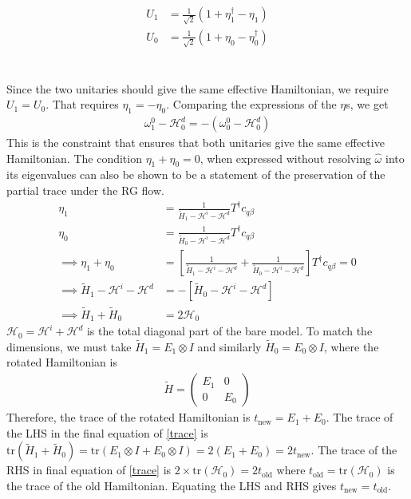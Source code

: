 \documentclass[twoside]{report}
\numberwithin{equation}{section}
\begin{document}
\begin{equation}\begin{aligned}
	U_1 &= \frac{1}{\sqrt 2}\left(1 + \eta_1^\dagger - \eta_1\right)\\
	U_0 &= \frac{1}{\sqrt 2}\left(1 + \eta_0 - \eta_0^\dagger\right)
\end{aligned}\end{equation}
\\\\Since the two unitaries should give the same effective Hamiltonian, we require \(U_1 = U_0\). That requires \(\eta_1 = -\eta_0\). Comparing the expressions of the \(\eta\)s, we get
\begin{equation}\begin{aligned}
	\omega_1^0 - \mathcal{H}^d_0 = -\left(\omega_0^0 - \mathcal{H}^d_0\right)
\end{aligned}\end{equation}
This is the constraint that ensures that both unitaries give the same effective Hamiltonian. The condition \(\eta_1 + \eta_0 = 0\), when expressed without resolving \(\hat \omega\) into its eigenvalues can also be shown to be a statement of the preservation of the partial trace under the RG flow.
\begin{equation}\begin{aligned}
	\label{trace}
\eta_1 &= \frac{1}{\tilde H_1 - \mathcal{H}^i - \mathcal{H}^d}T^\dagger c_{q\beta}\\
\eta_0 &= \frac{1}{\tilde H_0 - \mathcal{H}^i - \mathcal{H}^d}T^\dagger c_{q\beta}\\
\implies  \eta_1 + \eta_0 &= \left[\frac{1}{\tilde H_1 - \mathcal{H}^i - \mathcal{H}^d} + \frac{1}{\tilde H_0 - \mathcal{H}^i - \mathcal{H}^d}\right]T^\dagger c_{q\beta} = 0\\
\implies \tilde H_1 - \mathcal{H}^i - \mathcal{H}^d &= -\left[\tilde H_0 - \mathcal{H}^i - \mathcal{H}^d\right]\\
\implies \tilde H_1 + \tilde H_0 &= 2\mathcal{H}_0
\end{aligned}\end{equation}
\(\mathcal{H}_0 = \mathcal{H}^i + \mathcal{H}^d\) is the total diagonal part of the bare model. To match the dimensions, we must take \(\tilde H_1 = E_1 \otimes I\) and similarly \(\tilde H_0 = E_0 \otimes I\), where the rotated Hamiltonian is
\begin{equation}\begin{aligned}
\tilde H = \begin{pmatrix} E_1 & 0 \\ 0 & E_0\end{pmatrix}
\end{aligned}\end{equation}
Therefore, the trace of the rotated Hamiltonian is \(t_\text{new} = E_1 + E_0 \). The trace of the LHS in the final equation of \ref{trace} is \(\text{tr}\left(\tilde H_1 + \tilde H_0\right) = \text{tr}\left(E_1 \otimes I + E_0 \otimes I\right) = 2\left(E_1 + E_0\right) = 2t_\text{new}\). The trace of the RHS in final equation of \ref{trace} is \(2\times\text{tr}\left(\mathcal{H}_0\right) = 2t_\text{old}\) where \(t_\text{old} = \text{tr}\left(\mathcal{H}_0\right)\) is the trace of the old Hamiltonian. Equating the LHS and RHS gives \(t_\text{new} = t_\text{old}\).
\end{document}
